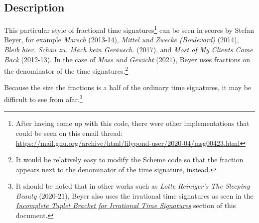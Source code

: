\subsection{Description}
This particular style of fractional time signatures\footnote{After having come up with this code, there were other implementations that could be seen on this email thread: \url{https://mail.gnu.org/archive/html/lilypond-user/2020-04/msg00423.html}} can be seen in scores by Stefan Beyer, for example \textit{Marsch} (2013-14),\autocite{RN1745} \textit{Mittel und Zwecke (Boulevard)} (2014),\autocite{RN1744} \textit{Bleib hier. Schau zu. Mach kein Geräusch.} (2017),\autocite{RN1743} and \textit{Most of My Clients Come Back} (2012-13).\autocite{RN1747} In the case of \textit{Mass und Gewicht} (2021), Beyer uses fractions on the denominator of the time signatures.\footnote{It would be relatively easy to modify the Scheme code so that the fraction appears next to the denominator of the time signature, instead.}

Because the size the fractions is a half of the ordinary time signatures, it may be difficult to see from afar.\footnote{It should be noted that in other works such as \textit{Lotte Reiniger's The Sleeping Beauty} (2020-21), Beyer also uses the irrational time signatures as seen in the \hyperref[sec:incompleteTuplet]{\textit{Incomplete Tuplet Bracket for Irrational Time Signatures}} section of this document.} 
\label{sec:time_signatures_styleA_convention}

